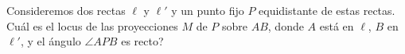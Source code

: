 Consideremos dos rectas $\ell$ y $\ell ' $ y un punto fijo $P$ equidistante de estas rectas. Cuál es el locus de las proyecciones $M$ de $P$ sobre $AB$, donde $A$ está en $\ell $, $B$ en $\ell ' $, y el ángulo $\angle APB$ es recto?
